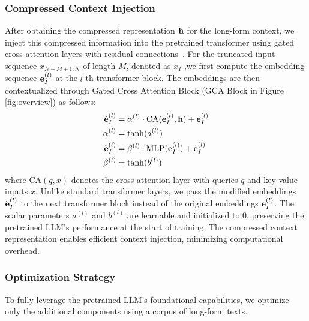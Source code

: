 

\subsubsection{Compressed Context Injection}
\label{subsubsection:CCI}
After obtaining the compressed representation $\mathbf{h}$ for the long-form context, we inject this compressed information into the pretrained transformer using gated cross-attention layers with residual connections~\cite{flamingo}. For the truncated input sequence $x_{N-M+1:N}$ of length $M$, denoted as $x_{I}$
,we first compute the embedding sequence $\mathbf{e}^{(l)}_{I}$ at the $l$-th transformer block. The embeddings are then contextualized through Gated Cross Attention Block (GCA Block in Figure \ref{fig:overview}) as follows:
\begin{align}
\begin{split}
    \Dot{\mathbf{e}}^{(l)}_{I} &= \alpha^{(l)} \cdot \mathrm{CA}(\mathbf{e}^{(l)}_{I}, \mathbf{h}) + \mathbf{e}^{(l)}_{I} \\
    \alpha^{(l)} &= \mathrm{tanh}(a^{(l)}) \\
    \Ddot{\mathbf{e}}^{(l)}_{I} &= \beta^{(l)} \cdot \mathrm{MLP}(\Dot{\mathbf{e}}^{(l)}_{I}) + \Dot{\mathbf{e}}^{(l)}_{I} \\
    \beta^{(l)} &= \mathrm{tanh}(b^{(l)})
\end{split}
\label{eq:GCAB}
\end{align}
where $\mathrm{CA}(q, x)$ denotes the cross-attention layer with queries $q$ and key-value inputs $x$. Unlike standard transformer layers, we pass the modified embeddings $\Ddot{\mathbf{e}}^{(l)}_{I}$ to the next transformer block instead of the original embeddings $\mathbf{e}^{(l)}_{I}$. The scalar parameters $a^{(l)}$ and $b^{(l)}$ are learnable and initialized to 0, preserving the pretrained LLM’s performance at the start of training. The compressed context representation enables efficient context injection, minimizing computational overhead.

\subsubsection{Optimization Strategy}
\label{subsubsection:optimization}
To fully leverage the pretrained LLM's foundational capabilities, we optimize only the additional components using a corpus of long-form texts.


